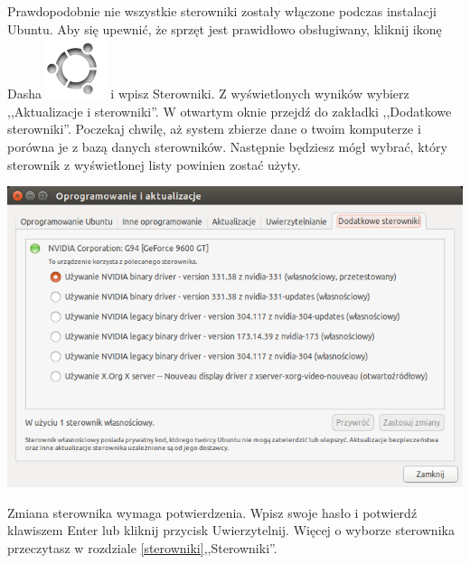 Prawdopodobnie nie wszystkie sterowniki zostały włączone podczas instalacji Ubuntu. Aby się upewnić, że sprzęt jest prawidłowo obsługiwany, kliknij ikonę Dasha \includegraphics[scale=0.35]{images/ikony_dash.png} i wpisz \textcolor{ubuntu_orange}{Sterowniki}. Z wyświetlonych wyników wybierz ,,Aktualizacje i sterowniki''. W otwartym oknie przejdź do zakładki ,,Dodatkowe sterowniki''. Poczekaj chwilę, aż system zbierze dane o twoim komputerze i porówna je z bazą danych sterowników. Następnie będziesz mógł wybrać, który sterownik z wyświetlonej listy powinien zostać użyty.
\begin{center}
	\includegraphics[width=\linewidth]{images/pierwsze_uruchomienie_driver2.png}
\end{center}

Zmiana sterownika wymaga potwierdzenia. Wpisz swoje hasło i potwierdź klawiszem Enter lub kliknij przycisk \textcolor{ubuntu_orange}{Uwierzytelnij}. Więcej o wyborze sterownika przeczytasz w rozdziale \ref{sterowniki},,Sterowniki''.

